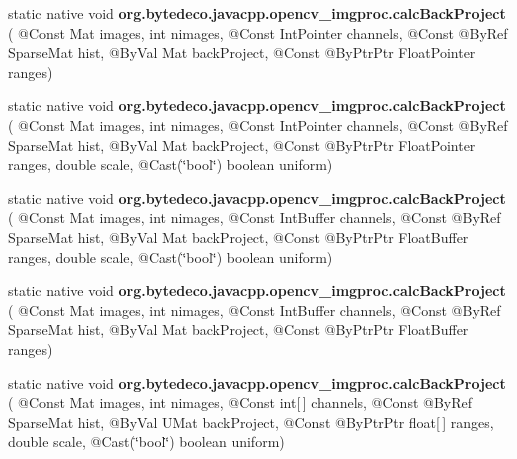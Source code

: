 \begin{DoxyCompactItemize}
\item 
\mbox{\label{group__imgproc__hist_gac4f5a5bfb26b835a39df88eac0c0ac52}} 
static native void {\bfseries org.\+bytedeco.\+javacpp.\+opencv\+\_\+imgproc.\+calc\+Back\+Project} ( @Const Mat images, int nimages, @Const Int\+Pointer channels, @Const @By\+Ref Sparse\+Mat hist, @By\+Val Mat back\+Project, @Const @By\+Ptr\+Ptr Float\+Pointer ranges)
\item 
\mbox{\label{group__imgproc__hist_gacbb1d983ac8bfe7d9c9b12e05c6aa5e8}} 
static native void {\bfseries org.\+bytedeco.\+javacpp.\+opencv\+\_\+imgproc.\+calc\+Back\+Project} ( @Const Mat images, int nimages, @Const Int\+Pointer channels, @Const @By\+Ref Sparse\+Mat hist, @By\+Val Mat back\+Project, @Const @By\+Ptr\+Ptr Float\+Pointer ranges, double scale, @Cast(\char`\"{}bool\char`\"{}) boolean uniform)
\item 
\mbox{\label{group__imgproc__hist_gacfd86500d632bf420e5e9bb4f0452422}} 
static native void {\bfseries org.\+bytedeco.\+javacpp.\+opencv\+\_\+imgproc.\+calc\+Back\+Project} ( @Const Mat images, int nimages, @Const Int\+Buffer channels, @Const @By\+Ref Sparse\+Mat hist, @By\+Val Mat back\+Project, @Const @By\+Ptr\+Ptr Float\+Buffer ranges, double scale, @Cast(\char`\"{}bool\char`\"{}) boolean uniform)
\item 
\mbox{\label{group__imgproc__hist_ga5ffa0309f32cff5e6c35525a7ee67725}} 
static native void {\bfseries org.\+bytedeco.\+javacpp.\+opencv\+\_\+imgproc.\+calc\+Back\+Project} ( @Const Mat images, int nimages, @Const Int\+Buffer channels, @Const @By\+Ref Sparse\+Mat hist, @By\+Val Mat back\+Project, @Const @By\+Ptr\+Ptr Float\+Buffer ranges)
\item 
\mbox{\label{group__imgproc__hist_ga926103594e5e9094f5d61c1ead0b50c4}} 
static native void {\bfseries org.\+bytedeco.\+javacpp.\+opencv\+\_\+imgproc.\+calc\+Back\+Project} ( @Const Mat images, int nimages, @Const int\mbox{[}$\,$\mbox{]} channels, @Const @By\+Ref Sparse\+Mat hist, @By\+Val U\+Mat back\+Project, @Const @By\+Ptr\+Ptr float\mbox{[}$\,$\mbox{]} ranges, double scale, @Cast(\char`\"{}bool\char`\"{}) boolean uniform)
\item 
\mbox{\label{group__imgproc__hist_gafc59a25db96c4d1665b2a18938b033c3}} 

\end{DoxyCompactItemize}
